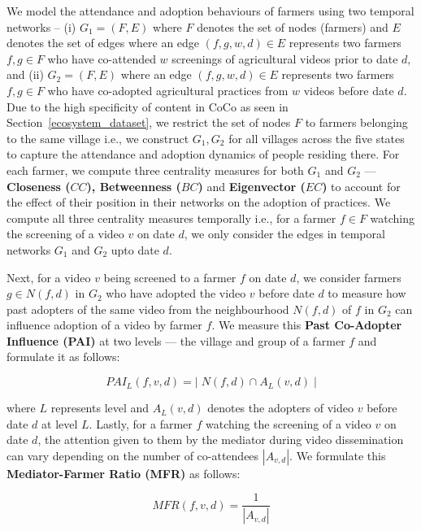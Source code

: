 \documentclass[manuscript,screen]{acmart}
\begin{document}
We model the attendance and adoption behaviours of farmers using two temporal networks -- (i) $G_{1} = (F,E)$ where $F$ denotes the set of nodes (farmers) and $E$ denotes the set of edges where an edge $(f,g,w,d) \in E$ represents two farmers $f,g \in F$ who have co-attended $w$ screenings of agricultural videos prior to date $d$, and (ii) $G_{2} = (F,E)$ where an edge $(f,g,w,d) \in E$ represents two farmers $f,g \in F$ who have co-adopted agricultural practices from $w$ videos before date $d$. Due to the high specificity of content in CoCo as seen in Section~\ref{ecosystem_dataset}, we restrict the set of nodes $F$ to farmers belonging to the same village i.e., we construct $G_{1},G_{2}$ for all villages across the five states to capture the attendance and adoption dynamics of people residing there. For each farmer, we compute three centrality measures for both $G_{1}$ and $G_{2}$ --- \textbf{Closeness ($CC$), Betweenness ($BC$)} and \textbf{Eigenvector ($EC$)} to account for the effect of their position in their networks on the adoption of practices. We compute all three centrality measures temporally i.e., for a farmer $f \in F$ watching the screening of a video $v$ on date $d$, we only consider the edges in temporal networks $G_{1}$ and $G_{2}$ upto date $d$. 

Next, for a video $v$ being screened to a farmer $f$ on date $d$, we consider farmers $g \in N(f,d)$ in $G_{2}$ who have adopted the video $v$ before date $d$ to measure how past adopters of the same video from the neighbourhood $N(f, d)$ of $f$ in $G_{2}$ can influence adoption of a video by farmer $f$. We measure this \textbf{Past Co-Adopter Influence (PAI)} at two levels --- the village and group of a farmer $f$ and formulate it as follows:

\begin{equation}
    PAI_{L}(f,v,d) = |\;{N(f,d) \cap A_{L}(v,d)}\;|
\end{equation}

where $L$ represents level and $A_{L}(v,d)$ denotes the adopters of video $v$ before date $d$ at level $L$. Lastly, for a farmer $f$ watching the screening of a video $v$ on date $d$, the attention given to them by the mediator during video dissemination can vary depending on the number of co-attendees $|A_{v,d}|$. We formulate this \textbf{Mediator-Farmer Ratio (MFR)} as follows: 

\begin{equation}
    MFR(f,v,d) = \frac{1}{|A_{v,d}|}
\end{equation}
\end{document}
